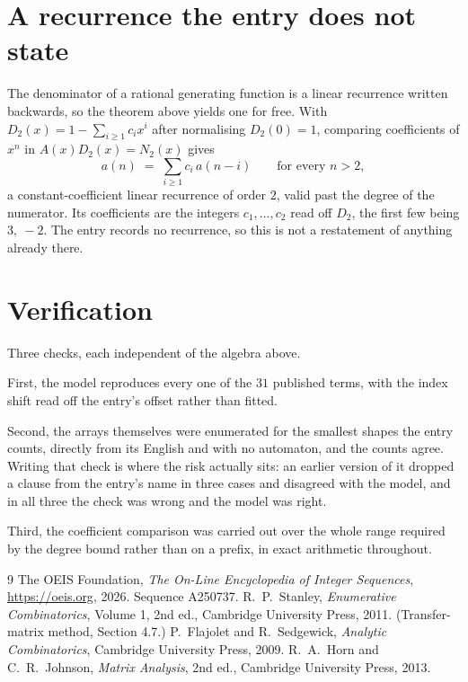 \documentclass[11pt,a4paper]{article}
\theoremstyle{plain}
\theoremstyle{definition}
\begin{document}
\section{A recurrence the entry does not state}

The denominator of a rational generating function is a linear recurrence written backwards, so
the theorem above yields one for free. With $D_2(x)=1-\sum_{i\ge1}c_ix^i$ after normalising
$D_2(0)=1$, comparing coefficients of $x^n$ in $A(x)D_2(x)=N_2(x)$ gives
\[
a(n)\;=\;\sum_{i\ge1}c_i\,a(n-i)\qquad\text{for every }n>2,
\]
a constant-coefficient linear recurrence of order $2$, valid past the degree of the
numerator. Its coefficients are the integers $c_1,\dots,c_{2}$ read off $D_2$, the first few being $3,\ -2$. The entry records no recurrence, so this is not a restatement of anything
already there.

\section{Verification}

Three checks, each independent of the algebra above.

First, the model reproduces every one of the $31$ published terms, with the index shift
read off the entry's offset rather than fitted.

Second, the arrays themselves were enumerated for the smallest shapes the entry counts,
directly from its English and with no automaton, and the counts agree. Writing that check is
where the risk actually sits: an earlier version of it dropped a clause from the entry's name
in three cases and disagreed with the model, and in all three the check was wrong and the model
was right.

Third, the coefficient comparison was carried out over the whole range required by the degree
bound rather than on a prefix, in exact arithmetic throughout.

\begin{thebibliography}{9}
 The OEIS Foundation, \emph{The On-Line Encyclopedia of Integer
Sequences}, \url{https://oeis.org}, 2026. Sequence A250737.
 R.~P.~Stanley, \emph{Enumerative Combinatorics}, Volume 1, 2nd ed.,
Cambridge University Press, 2011. (Transfer-matrix method, Section 4.7.)
 P.~Flajolet and R.~Sedgewick, \emph{Analytic Combinatorics}, Cambridge
University Press, 2009.
 R.~A.~Horn and C.~R.~Johnson, \emph{Matrix Analysis}, 2nd ed., Cambridge
University Press, 2013.
\end{thebibliography}
\end{document}
